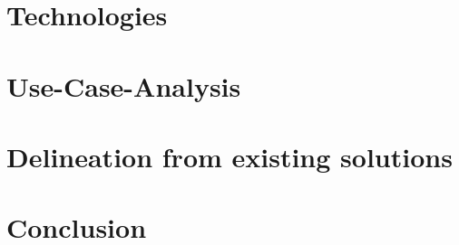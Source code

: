\section{Technologies}
\doit


\section{Use-Case-Analysis}
\doit

\section{Delineation from existing solutions}
\doit


\section{Conclusion}
\doit
